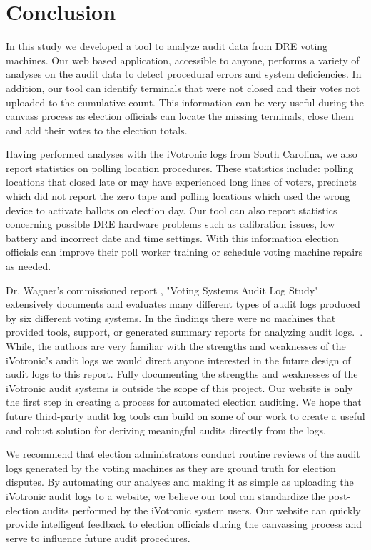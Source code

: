 \section{Conclusion}
In this study we developed a tool to analyze audit data from DRE voting machines. Our web based application, accessible to anyone, performs a variety of analyses on the audit data to detect procedural errors and system deficiencies. In addition, our tool can identify terminals that were not closed and their votes not uploaded to the cumulative count. This information can be very useful during the canvass process as election officials can locate the missing terminals, close them and add their votes to the election totals. 

Having performed analyses with the iVotronic logs from South Carolina, we also report statistics on polling location procedures. These statistics include: polling locations that closed late or may have experienced long lines of voters, precincts which did not report the zero tape and polling locations which used the wrong device to activate ballots on election day. Our tool can also report statistics concerning possible DRE hardware problems such as calibration issues, low battery and incorrect date and time settings. With this information election officials can improve their poll worker training or schedule voting machine repairs as needed.

Dr. Wagner's commissioned report ,  "Voting Systems Audit Log Study" extensively documents and evaluates many different types of audit logs produced by six different voting systems.  In the findings there were no machines that provided tools, support, or generated summary reports for analyzing audit logs.~\cite{Wagner2010}. While, the authors are very familiar with the strengths and weaknesses of the iVotronic's audit logs we would direct anyone interested in the future design of audit logs to this report.  Fully documenting the strengths and weaknesses of the iVotronic audit systems is outside the scope of this project. Our website is only the first step in creating a process for automated election auditing.  We hope that future third-party audit log  tools can build on some of our work to create a useful and robust solution for deriving meaningful audits directly from the logs.

We recommend that election administrators conduct routine reviews of the audit logs generated by the voting machines as they are ground truth for election disputes. By automating our analyses and making it as simple as uploading the iVotronic audit logs to a website, we believe our tool can standardize the post-election audits performed by the iVotronic system users. Our website can quickly provide intelligent feedback to election officials during the canvassing process and serve to influence future audit procedures. 
